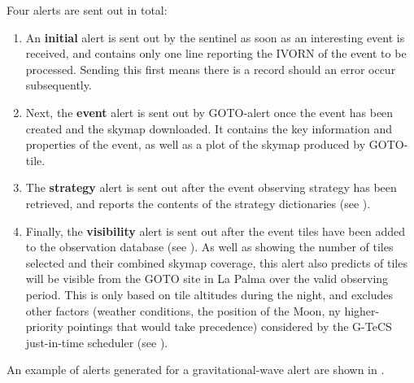 \begin{colsection}
\begin{colsection}
Four alerts are sent out in total:
%
\begin{enumerate}
    \item An \textbf{initial} alert is sent out by the sentinel as soon as an interesting event is received, and contains only one line reporting the IVORN of the event to be processed. Sending this first means there is a record should an error occur subsequently.
    \item Next, the \textbf{event} alert is sent out by GOTO-alert once the event has been created and the skymap downloaded. It contains the key information and properties of the event, as well as a plot of the skymap produced by GOTO-tile.
    \item The \textbf{strategy} alert is sent out after the event observing strategy has been retrieved, and reports the contents of the strategy dictionaries (see ).
    \item Finally, the \textbf{visibility} alert is sent out after the event tiles have been added to the observation database (see ). As well as showing the number of tiles selected and their combined skymap coverage, this alert also predicts of tiles will be visible from the GOTO site in La Palma over the valid observing period. This is only based on tile altitudes during the night, and excludes other factors (weather conditions, the position of the Moon, ny higher-priority pointings that would take precedence) considered by the G-TeCS just-in-time scheduler (see ).
\end{enumerate}
%
An example of alerts generated for a gravitational-wave alert are shown in .


\end{colsection}
\end{colsection}
